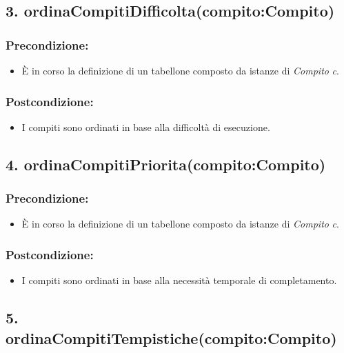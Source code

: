 \subsection*{3. ordinaCompitiDifficolta(compito:Compito)}

\subsubsection*{Precondizione:}
\begin{itemize}
    \item È in corso la definizione di un tabellone composto da istanze di \textit{Compito} \textit{c}.
\end{itemize}

\subsubsection*{Postcondizione:}
\begin{itemize}
    \item I compiti sono ordinati in base alla difficoltà di esecuzione.
\end{itemize}

\subsection*{4. ordinaCompitiPriorita(compito:Compito)}

\subsubsection*{Precondizione:}
\begin{itemize}
    \item È in corso la definizione di un tabellone composto da istanze di \textit{Compito} \textit{c}.
\end{itemize}

\subsubsection*{Postcondizione:}
\begin{itemize}
    \item I compiti sono ordinati in base alla necessità temporale di completamento.
\end{itemize}

\subsection*{5. ordinaCompitiTempistiche(compito:Compito)}


